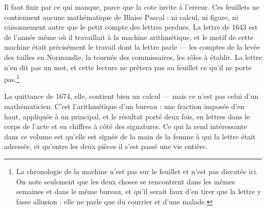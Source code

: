 \documentclass[11pt,a4paper]{article}
\begin{document}
Il faut finir par ce qui manque, parce que la cote invite à l'erreur. Ces
feuillets ne contiennent aucune mathématique de Blaise Pascal : ni calcul, ni
figure, ni raisonnement autre que le petit compte des lettres perdues. La
lettre de 1643 est de l'année même où il travaillait à la machine
arithmétique, et le motif de cette machine était précisément le travail dont
la lettre parle — les comptes de la levée des tailles en Normandie, la tournée
des commissaires, les rôles à établir. La lettre n'en dit pas un mot, et cette
lecture ne prêtera pas au feuillet ce qu'il ne porte pas.\footnote{La
chronologie de la machine n'est pas sur le feuillet et n'est pas discutée ici.
On note seulement que les deux choses se rencontrent dans les mêmes semaines
et dans le même bureau, et qu'il serait faux d'en tirer que la lettre y
fasse allusion : elle ne parle que du courrier et d'une malade.}

La quittance de 1674, elle, contient bien un calcul — mais ce n'est pas celui
d'un mathématicien. C'est l'arithmétique d'un bureau : une fraction imposée
d'en haut, appliquée à un principal, et le résultat porté deux fois, en
lettres dans le corps de l'acte et en chiffres à côté des signatures. Ce qui
la rend intéressante dans ce volume est qu'elle est signée de la main de la
femme à qui la lettre était adressée, et qu'entre les deux pièces il s'est
passé une vie entière.
\end{document}
